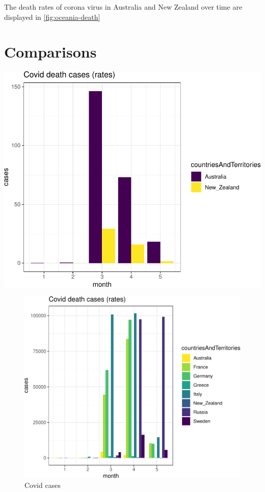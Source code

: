 \documentclass[11pt,a4paper,]{article}
\begin{document}
The death rates of corona virus in Australia and New Zealand over time are displayed in \ref{fig:oceania-death}

\hypertarget{comparisons}{%
\section{Comparisons}\label{comparisons}}

\begin{center}\includegraphics{Week8_demo_files/figure-latex/unnamed-chunk-3-1} \end{center}

\begin{figure}

{\centering \includegraphics{Week8_demo_files/figure-latex/unnamed-chunk-4-1} 

}

\caption{Covid cases}\label{fig:unnamed-chunk-4}
\end{figure}
\end{document}
